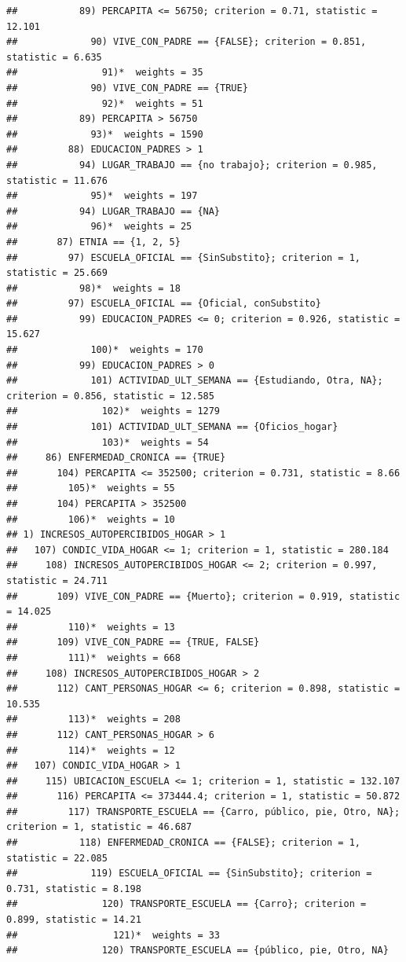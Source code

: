 \documentclass[
]{article}
\begin{document}
\begin{verbatim}
##           89) PERCAPITA <= 56750; criterion = 0.71, statistic = 12.101
##             90) VIVE_CON_PADRE == {FALSE}; criterion = 0.851, statistic = 6.635
##               91)*  weights = 35 
##             90) VIVE_CON_PADRE == {TRUE}
##               92)*  weights = 51 
##           89) PERCAPITA > 56750
##             93)*  weights = 1590 
##         88) EDUCACION_PADRES > 1
##           94) LUGAR_TRABAJO == {no trabajo}; criterion = 0.985, statistic = 11.676
##             95)*  weights = 197 
##           94) LUGAR_TRABAJO == {NA}
##             96)*  weights = 25 
##       87) ETNIA == {1, 2, 5}
##         97) ESCUELA_OFICIAL == {SinSubstito}; criterion = 1, statistic = 25.669
##           98)*  weights = 18 
##         97) ESCUELA_OFICIAL == {Oficial, conSubstito}
##           99) EDUCACION_PADRES <= 0; criterion = 0.926, statistic = 15.627
##             100)*  weights = 170 
##           99) EDUCACION_PADRES > 0
##             101) ACTIVIDAD_ULT_SEMANA == {Estudiando, Otra, NA}; criterion = 0.856, statistic = 12.585
##               102)*  weights = 1279 
##             101) ACTIVIDAD_ULT_SEMANA == {Oficios_hogar}
##               103)*  weights = 54 
##     86) ENFERMEDAD_CRONICA == {TRUE}
##       104) PERCAPITA <= 352500; criterion = 0.731, statistic = 8.66
##         105)*  weights = 55 
##       104) PERCAPITA > 352500
##         106)*  weights = 10 
## 1) INCRESOS_AUTOPERCIBIDOS_HOGAR > 1
##   107) CONDIC_VIDA_HOGAR <= 1; criterion = 1, statistic = 280.184
##     108) INCRESOS_AUTOPERCIBIDOS_HOGAR <= 2; criterion = 0.997, statistic = 24.711
##       109) VIVE_CON_PADRE == {Muerto}; criterion = 0.919, statistic = 14.025
##         110)*  weights = 13 
##       109) VIVE_CON_PADRE == {TRUE, FALSE}
##         111)*  weights = 668 
##     108) INCRESOS_AUTOPERCIBIDOS_HOGAR > 2
##       112) CANT_PERSONAS_HOGAR <= 6; criterion = 0.898, statistic = 10.535
##         113)*  weights = 208 
##       112) CANT_PERSONAS_HOGAR > 6
##         114)*  weights = 12 
##   107) CONDIC_VIDA_HOGAR > 1
##     115) UBICACION_ESCUELA <= 1; criterion = 1, statistic = 132.107
##       116) PERCAPITA <= 373444.4; criterion = 1, statistic = 50.872
##         117) TRANSPORTE_ESCUELA == {Carro, público, pie, Otro, NA}; criterion = 1, statistic = 46.687
##           118) ENFERMEDAD_CRONICA == {FALSE}; criterion = 1, statistic = 22.085
##             119) ESCUELA_OFICIAL == {SinSubstito}; criterion = 0.731, statistic = 8.198
##               120) TRANSPORTE_ESCUELA == {Carro}; criterion = 0.899, statistic = 14.21
##                 121)*  weights = 33 
##               120) TRANSPORTE_ESCUELA == {público, pie, Otro, NA}

\end{verbatim}
\end{document}
